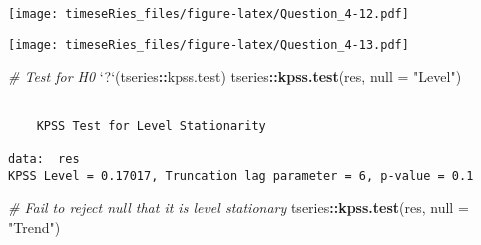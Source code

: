 \documentclass[]{book}
\newenvironment{Shaded}{\begin{snugshade}}{\end{snugshade}}
\newcommand{\KeywordTok}[1]{\textcolor[rgb]{0.13,0.29,0.53}{\textbf{#1}}}
\newcommand{\DataTypeTok}[1]{\textcolor[rgb]{0.13,0.29,0.53}{#1}}
\newcommand{\DecValTok}[1]{\textcolor[rgb]{0.00,0.00,0.81}{#1}}
\newcommand{\StringTok}[1]{\textcolor[rgb]{0.31,0.60,0.02}{#1}}
\newcommand{\CommentTok}[1]{\textcolor[rgb]{0.56,0.35,0.01}{\textit{#1}}}
\newcommand{\OperatorTok}[1]{\textcolor[rgb]{0.81,0.36,0.00}{\textbf{#1}}}
\newcommand{\NormalTok}[1]{#1}
\begin{document}
\begin{Shaded}
\end{Shaded}

\texttt{[image: timeseRies\_files/figure-latex/Question\_4-12.pdf]}

\begin{Shaded}
\end{Shaded}

\texttt{[image: timeseRies\_files/figure-latex/Question\_4-13.pdf]}

\begin{Shaded}
\begin{Highlighting}[]
\CommentTok{# Test for H0}
\StringTok{`}\DataTypeTok{?}\StringTok{`}\NormalTok{(tseries}\OperatorTok{::}\NormalTok{kpss.test)}
\NormalTok{tseries}\OperatorTok{::}\KeywordTok{kpss.test}\NormalTok{(res, }\DataTypeTok{null =} \StringTok{"Level"}\NormalTok{)}
\end{Highlighting}
\end{Shaded}

\begin{verbatim}

    KPSS Test for Level Stationarity

data:  res
KPSS Level = 0.17017, Truncation lag parameter = 6, p-value = 0.1
\end{verbatim}

\begin{Shaded}
\begin{Highlighting}[]
\CommentTok{# Fail to reject null that it is level stationary}
\NormalTok{tseries}\OperatorTok{::}\KeywordTok{kpss.test}\NormalTok{(res, }\DataTypeTok{null =} \StringTok{"Trend"}\NormalTok{)}
\end{Highlighting}
\end{Shaded}
\end{document}
